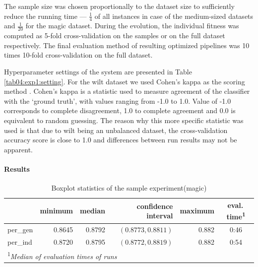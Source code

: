 The sample size was chosen proportionally to the dataset size to sufficiently
reduce the running time --- $\frac{1}{4}$ of all instances in case of the
medium-sized datasets and $\frac{1}{20}$ for the magic dataset. During the
evolution, the individual fitness was computed as 5-fold cross-validation on
the samples or on the full dataset respectively. The final evaluation method of
resulting optimized pipelines was 10 times 10-fold cross-validation on
the full dataset.

Hyperparameter settings of the system are presented in Table
\ref{tab04:exp1:setting}. For the wilt dataset we used Cohen's kappa
as the scoring method \citep{doi:10.1177/001316446002000104}. Cohen's kappa is a statistic used to measure agreement
of the classifier with the `ground truth', with values ranging from -1.0 to 1.0.
Value of -1.0 corresponds to complete disagreement, 1.0 to complete agreement
and 0.0 is equivalent to random guessing. The reason why this more specific
statistic was used is that due to wilt being an unbalanced dataset, the
cross-validation accuracy score is close to 1.0 and differences between
run results may not be apparent.

\paragraph{Results}

\begin{table}[ht]
\centering
\caption{Boxplot statistics of the sample experiment(magic)}\label{tab04:exp1:magboxstats}

\begin{tabular}{lrrrr|c}
\toprule
{} &  minimum &  median &  confidence interval &  maximum & eval.\,time\textsuperscript{1} \\
\midrule
per\_gen &   0.8645 &  0.8792 & $(0.8773,0.8811)$ &    0.882 & 0:46 \\
per\_ind &   0.8720 &  0.8795 & $(0.8772,0.8819)$ &    0.882 & 0:54 \\
\bottomrule

\multicolumn{6}{l}{\footnotesize\textsuperscript{1}\itshape Median of evaluation times of runs}

\end{tabular}

\end{table}

